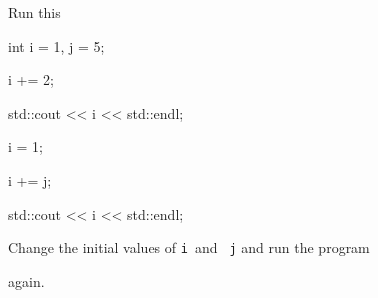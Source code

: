 Run this

\begin{console}

int i = 1, j = 5;



i += 2;

std::cout << i << std::endl;



i = 1;

i += j;

std::cout << i << std::endl;

\end{console}

Change the initial values of \texttt{i }and \texttt{ j} and run the program

again.

